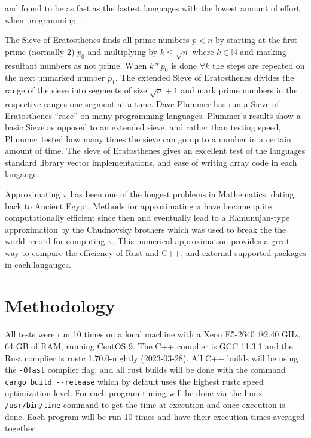 \documentclass[10pt]{IEEEtran}
\begin{document}
and found to be as fast as the fastest languages with the lowest amount of effort when programming~\cite{costanzo2021performance}\cite{heyman2020comparison}.
\par
The Sieve of Eratosthenes finds all prime numbers $p<n$ by starting at the first prime (normally 2) $p_0$ and multiplying by $k \leq \sqrt{n}$ where $k \in \mathbb{N}$ and marking resultant numbers as not prime.
When $k*p_0$ is done $\forall k$ the steps are repeated on the next unmarked number $p_1$.
The extended Sieve of Eratosthenes divides the range of the sieve into segments of size $\sqrt{n}+1$ and mark prime numbers in the respective ranges one segment at a time.
Dave Plummer has run a Sieve of Eratosthenes “race” on many programming languages\cite{plummer}. 
Plummer's results show a basic Sieve as opposed to an extended sieve, and rather than testing speed, Plummer tested how many times 
the sieve can go up to a number in a certain amount of time. 
The sieve of Eratosthenes gives an excellent test of the languages standard library vector implementations, and ease of writing array code in each langauge.
\par
Approximating $\pi$ has been one of the longest problems in Mathematics, dating back to Ancient Egypt\cite{burton}. Methods for approximating $\pi$ have become quite computationally efficient since then and eventually 
lead to a Ramunujan-type approximation by the Chudnovsky brothers which was used to break the the world record for computing $\pi$\cite{lynn}.
This numerical approximation provides a great way to compare the efficiency of Rust and C++, and external supported packages in each langauges.

\section{Methodology}
All tests were run 10 times on a local machine with a Xeon E5-2640 @2.40 GHz, 64 GB of RAM, running CentOS 9. The C++ complier is GCC 11.3.1 and the Rust complier is rustc 1.70.0-nightly (2023-03-28). All C++ builds will be using the \verb|-Ofast| 
compiler flag, and all rust builds will be done with the command \verb|cargo build --release| which by default 
uses the highest rustc speed optimization level\cite{cargobook}. For each program timing will be done via the linux \verb|/usr/bin/time| command to get the time at execution and once execution is done.
Each program will be run 10 times and have their execution times averaged together.
\end{document}

